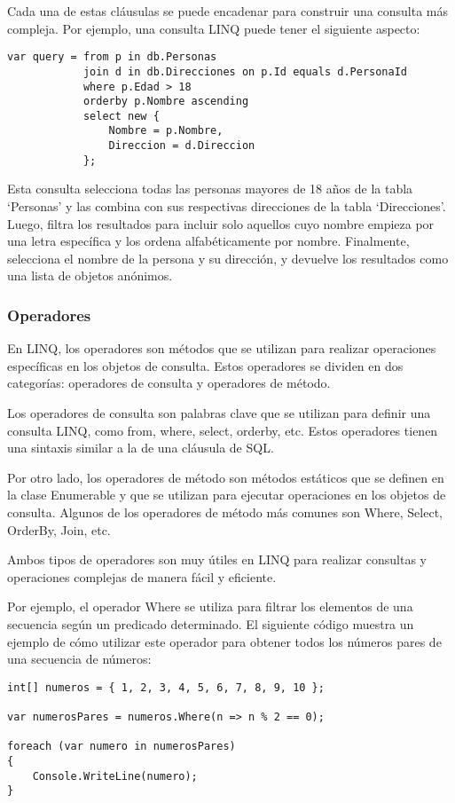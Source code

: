 \documentclass[executivepaper]{article}
\begin{document}
Cada una de estas cláusulas se puede encadenar para construir una consulta más compleja. Por ejemplo, una consulta LINQ puede tener el siguiente aspecto:
\begin{lstlisting}
var query = from p in db.Personas
            join d in db.Direcciones on p.Id equals d.PersonaId
            where p.Edad > 18
            orderby p.Nombre ascending
            select new {
                Nombre = p.Nombre,
                Direccion = d.Direccion
            };    
\end{lstlisting}

Esta consulta selecciona todas las personas mayores de 18 años de la tabla \enquote*{Personas} y las combina con sus respectivas direcciones de la tabla \enquote*{Direcciones}. Luego, filtra los resultados para incluir solo aquellos cuyo nombre empieza por una letra específica y los ordena alfabéticamente por nombre. Finalmente, selecciona el nombre de la persona y su dirección, y devuelve los resultados como una lista de objetos anónimos.

\subsubsection*{Operadores}

En LINQ, los operadores son métodos que se utilizan para realizar operaciones específicas en los objetos de consulta. Estos operadores se dividen en dos categorías: operadores de consulta y operadores de método.

Los operadores de consulta son palabras clave que se utilizan para definir una consulta LINQ, como from, where, select, orderby, etc. Estos operadores tienen una sintaxis similar a la de una cláusula de SQL.

Por otro lado, los operadores de método son métodos estáticos que se definen en la clase Enumerable y que se utilizan para ejecutar operaciones en los objetos de consulta. Algunos de los operadores de método más comunes son Where, Select, OrderBy, Join, etc.

Ambos tipos de operadores son muy útiles en LINQ para realizar consultas y operaciones complejas de manera fácil y eficiente.

Por ejemplo, el operador Where se utiliza para filtrar los elementos de una secuencia según un predicado determinado. El siguiente código muestra un ejemplo de cómo utilizar este operador para obtener todos los números pares de una secuencia de números:

\begin{lstlisting}
int[] numeros = { 1, 2, 3, 4, 5, 6, 7, 8, 9, 10 };

var numerosPares = numeros.Where(n => n % 2 == 0);

foreach (var numero in numerosPares)
{
    Console.WriteLine(numero);
}
\end{lstlisting}
\end{document}
